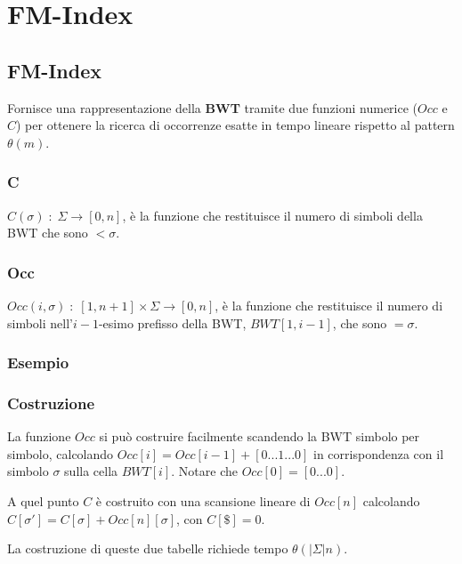 \chapter{FM-Index}

\section{FM-Index}

Fornisce una rappresentazione della \textbf{BWT} tramite due funzioni numerice ($Occ$ e $C$) per ottenere la ricerca di occorrenze esatte in tempo lineare rispetto al pattern $\theta(m)$.

\subsection{C}

$C(\sigma) \; : \; \Sigma \rightarrow [0,n]$, \`e la funzione che restituisce il numero di simboli della BWT che sono $< \sigma$.

\subsection{Occ}

$Occ(i, \sigma) \; : \; [1,n+1] \times \Sigma \rightarrow [0,n]$, \`e la funzione che restituisce il numero di simboli nell'${i-1}$-esimo prefisso della BWT, $BWT[1,i-1]$, che sono $= \sigma$.

\subsection{Esempio}


\subsection{Costruzione}

La funzione $Occ$ si pu\`o costruire facilmente scandendo la BWT simbolo per simbolo, calcolando $Occ[i] = Occ[i-1] + [0 ... 1 ... 0]$ in corrispondenza con il simbolo $\sigma$ sulla cella $BWT[i]$. Notare che $Occ[0] = [0 ... 0]$.

A quel punto $C$ \`e costruito con una scansione lineare di $Occ[n]$ calcolando $C[\sigma'] = C[\sigma] + Occ[n][\sigma]$, con $C[\$] = 0$.

La costruzione di queste due tabelle richiede tempo $\theta(|\Sigma|n)$.

